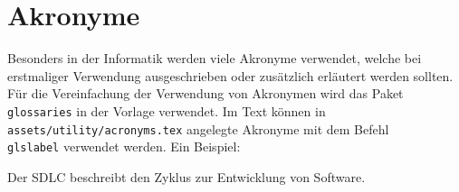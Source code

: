 \chapter{Akronyme}
Besonders in der Informatik werden viele Akronyme verwendet, welche bei erstmaliger Verwendung ausgeschrieben oder zusätzlich erläutert werden sollten. Für die Vereinfachung der Verwendung von Akronymen wird das Paket \texttt{glossaries} in der Vorlage verwendet. Im Text können in \texttt{assets/utility/acronyms.tex} angelegte Akronyme mit dem Befehl \texttt{\\gls{label}} verwendet werden. Ein Beispiel:

Der \gls{SDLC} beschreibt den Zyklus zur Entwicklung von Software.